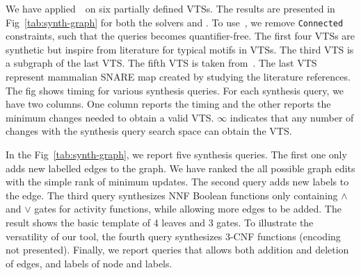 We have applied~\ourtool~on six partially defined VTSs.
%
The results are presented in Fig~\ref{tab:synth-graph} for both the solvers
\depqbf and \zthree.
%
To use~\zthree, we remove \texttt{Connected} constraints, such that the queries becomes
quantifier-free.
%
%
%
The first four VTSs are synthetic but inspire from literature for
typical motifs in VTSs. 
The third VTS is a subgraph of the last VTS.
%
%
The fifth VTS is taken from~\cite{burri2004complete}.
%
The last VTS represent mammalian SNARE map created by studying the literature references.  
%
The fig shows timing for various synthesis queries.
%
For each synthesis query, we have two columns.
%
One column reports the timing and the other reports the minimum changes needed to obtain a valid VTS.
%
$\infty$ indicates that any number of changes with the synthesis query
search space can obtain the VTS.
%

In the Fig~\ref{tab:synth-graph}, we report five synthesis queries.
%
The first one only adds new labelled edges to the graph.
%
We have ranked the all possible graph edits with the simple rank of
minimum updates.
%
The second query adds new labels to the edge.
%
The third query synthesizes NNF Boolean functions only containing
$\land$ and $\lor$ gates for activity functions, while allowing
more edges to be added.
%
The result shows the basic template of 4 leaves and 3 gates.
%
%
To illustrate the versatility of our tool, the fourth query
synthesizes $3$-CNF functions (encoding not presented).
%
Finally, we report queries that allows both addition and deletion of edges, and labels
of node and labels. 

%
%

